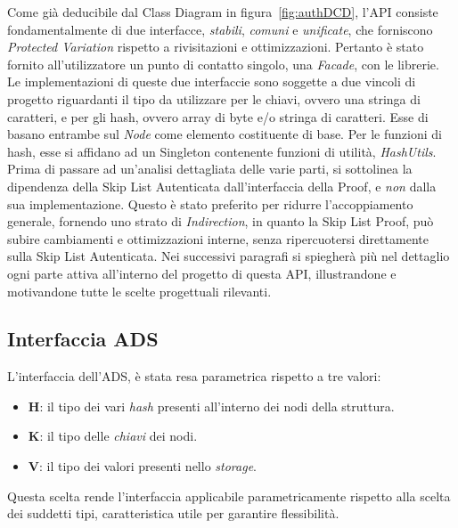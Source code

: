 	Come già deducibile dal Class Diagram in figura~\ref{fig:authDCD}, l'API consiste fondamentalmente di due interfacce, \textit{stabili}, \textit{comuni} e \textit{unificate}, che forniscono \textit{Protected Variation} rispetto a rivisitazioni e ottimizzazioni. Pertanto è stato fornito all'utilizzatore un punto di contatto singolo, una \textit{Facade}, con le librerie. 
	Le implementazioni di queste due interfaccie sono soggette a due vincoli di progetto riguardanti il tipo da utilizzare per le chiavi, ovvero una stringa di caratteri, e per gli hash, ovvero array di byte e/o stringa di caratteri. Esse di basano entrambe sul \textit{Node} come elemento costituente di base. Per le funzioni di hash, esse si affidano ad un Singleton contenente funzioni di utilità, \textit{HashUtils}. Prima di passare ad un'analisi dettagliata delle varie parti, si sottolinea la dipendenza della Skip List Autenticata dall'interfaccia della Proof, e \textit{non} dalla sua implementazione. Questo è stato preferito per ridurre l'accoppiamento generale, fornendo uno strato di \textit{Indirection}, in quanto la Skip List Proof, può subire cambiamenti e ottimizzazioni interne, senza ripercuotersi direttamente sulla Skip List Autenticata.
	Nei successivi paragrafi si spiegherà più nel dettaglio ogni parte attiva all'interno del progetto di questa API, illustrandone e motivandone tutte le scelte progettuali rilevanti.
	
	\subsection{Interfaccia ADS}
	
	
		L'interfaccia dell'ADS, è stata resa parametrica rispetto a tre valori:
		
		\begin{itemize}
			\item \textbf{H}: il tipo dei vari \textit{hash} presenti all'interno dei nodi della struttura.
			\item \textbf{K}: il tipo delle \textit{chiavi} dei nodi.
			\item \textbf{V}: il tipo dei valori presenti nello \textit{storage}. 
		\end{itemize}
	
		Questa scelta rende l'interfaccia applicabile parametricamente rispetto alla scelta dei suddetti tipi, caratteristica utile per garantire flessibilità. 

